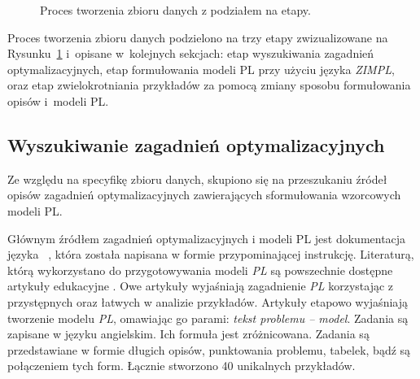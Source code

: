 \begin{figure}
\caption{Proces tworzenia zbioru danych z podziałem na etapy.}
\label{fig:dataset-creation-logical}
\end{figure}

Proces tworzenia zbioru danych podzielono na trzy etapy zwizualizowane na Rysunku~\ref{fig:dataset-creation-logical} i~opisane w~kolejnych sekcjach: etap wyszukiwania zagadnień optymalizacyjnych, etap formułowania modeli PL przy użyciu języka \textit{ZIMPL}, oraz etap zwielokrotniania przykładów za pomocą zmiany sposobu formułowania opisów i~modeli PL. %



\subsection{Wyszukiwanie zagadnień optymalizacyjnych}


Ze względu na specyfikę zbioru danych, skupiono się na przeszukaniu źródeł opisów zagadnień optymalizacyjnych zawierających sformułowania wzorcowych modeli PL.

Głównym źródłem zagadnień optymalizacyjnych i modeli PL jest dokumentacja języka  ~\cite{zimpl_manual}, która została napisana w formie przypominającej instrukcję. Literaturą, którą wykorzystano do przygotowywania modeli \textit{PL} są powszechnie dostępne artykuły edukacyjne \cite{brilliant_linear,byjus_linear,cimt,arsdcollege2020,libretexts_linear,superprof_linear,toppr_graphical}. Owe artykuły wyjaśniają zagadnienie \textit{PL} korzystając z przystępnych oraz łatwych w analizie przykładów. Artykuły etapowo wyjaśniają tworzenie modelu \textit{PL}, omawiając go parami: \textit{tekst problemu -- model}. Zadania są zapisane w języku angielskim. Ich formuła jest zróżnicowana. Zadania są przedstawiane w formie długich opisów, punktowania problemu, tabelek, bądź są połączeniem tych form. Łącznie stworzono 40 unikalnych przykładów. 

